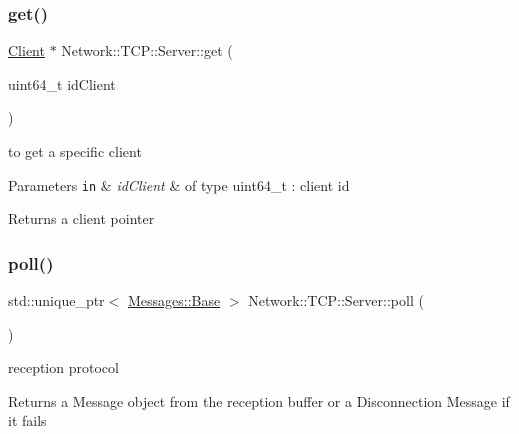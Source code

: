 \subsubsection{\texorpdfstring{get()}{get()}}
{\footnotesize\ttfamily \hyperlink{class_network_1_1_t_c_p_1_1_client}{Client} $\ast$ Network\+::\+T\+C\+P\+::\+Server\+::get (\begin{DoxyParamCaption}\item[{uint64\+\_\+t}]{id\+Client }\end{DoxyParamCaption})}



to get a specific client 


\begin{DoxyParams}[1]{Parameters}
\mbox{\tt in}  & {\em id\+Client} & of type uint64\+\_\+t \+: client id \\
\hline
\end{DoxyParams}
\begin{DoxyReturn}{Returns}
a client pointer 
\end{DoxyReturn}
\mbox{\label{class_network_1_1_t_c_p_1_1_server_ac4cc0dc0661e293f522a0bb7089bbfbe}} 
\subsubsection{\texorpdfstring{poll()}{poll()}}
{\footnotesize\ttfamily std\+::unique\+\_\+ptr$<$ \hyperlink{class_network_1_1_messages_1_1_base}{Messages\+::\+Base} $>$ Network\+::\+T\+C\+P\+::\+Server\+::poll (\begin{DoxyParamCaption}{ }\end{DoxyParamCaption})}



reception protocol 

\begin{DoxyReturn}{Returns}
a Message object from the reception buffer or a Disconnection Message if it fails 
\end{DoxyReturn}
\mbox{\label{class_network_1_1_t_c_p_1_1_server_af7896a328c27db52fd99e0c5888754f1}} 
